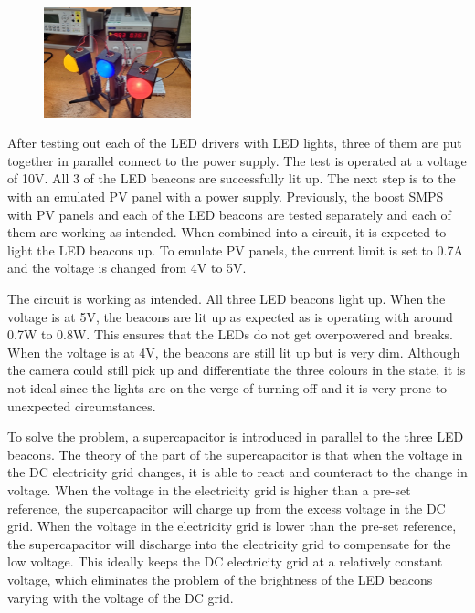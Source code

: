 \begin{figure}
    \includegraphics[width=0.38\textwidth]{images/all-leds.jpg}
\end{figure}

After testing out each of the LED drivers with LED lights, three of them are put together in parallel connect to the power supply. The test is operated at a voltage of 10V. All 3 of the LED beacons are successfully lit up. The next step is to the with an emulated PV panel with a power supply. Previously, the boost SMPS with PV panels and each of the LED beacons are tested separately and each of them are working as intended. When combined into a circuit, it is expected to light the LED beacons up. To emulate PV panels, the current limit is set to 0.7A and the voltage is changed from 4V to 5V.

The circuit is working as intended. All three LED beacons light up. When the voltage is at 5V, the beacons are lit up as expected as is operating with around 0.7W to 0.8W. This ensures that the LEDs do not get overpowered and breaks. When the voltage is at 4V, the beacons are still lit up but is very dim. Although the camera could still pick up and differentiate the three colours in the state, it is not ideal since the lights are on the verge of turning off and it is very prone to unexpected circumstances.

To solve the problem, a supercapacitor is introduced in parallel to the three LED beacons. The theory of the part of the supercapacitor is that when the voltage in the DC electricity grid changes, it is able to react and counteract to the change in voltage. When the voltage in the electricity grid is higher than a pre-set reference, the supercapacitor will charge up from the excess voltage in the DC grid. When the voltage in the electricity grid is lower than the pre-set reference, the supercapacitor will discharge into the electricity grid to compensate for the low voltage. This ideally keeps the DC electricity grid at a relatively constant voltage, which eliminates the problem of the brightness of the LED beacons varying with the voltage of the DC grid.

